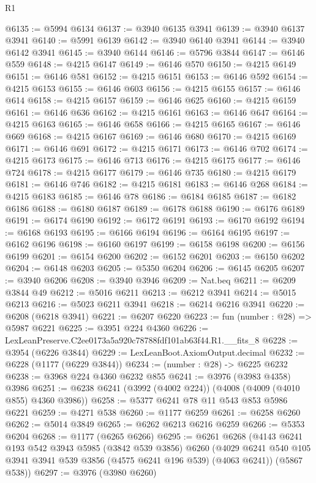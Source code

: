 \begin{lexlean}{R1}
\begin{coremodule}
@6135 := @5994 @6134
@6137 := @3940 @6135 @3941
@6139 := @3940 @6137 @3941
@6140 := @5991 @6139
@6142 := @3940 @6140 @3941
@6144 := @3940 @6142 @3941
@6145 := @3940 @6144
@6146 := @5796 @3844
@6147 := @6146 @559
@6148 := @4215 @6147
@6149 := @6146 @570
@6150 := @4215 @6149
@6151 := @6146 @581
@6152 := @4215 @6151
@6153 := @6146 @592
@6154 := @4215 @6153
@6155 := @6146 @603
@6156 := @4215 @6155
@6157 := @6146 @614
@6158 := @4215 @6157
@6159 := @6146 @625
@6160 := @4215 @6159
@6161 := @6146 @636
@6162 := @4215 @6161
@6163 := @6146 @647
@6164 := @4215 @6163
@6165 := @6146 @658
@6166 := @4215 @6165
@6167 := @6146 @669
@6168 := @4215 @6167
@6169 := @6146 @680
@6170 := @4215 @6169
@6171 := @6146 @691
@6172 := @4215 @6171
@6173 := @6146 @702
@6174 := @4215 @6173
@6175 := @6146 @713
@6176 := @4215 @6175
@6177 := @6146 @724
@6178 := @4215 @6177
@6179 := @6146 @735
@6180 := @4215 @6179
@6181 := @6146 @746
@6182 := @4215 @6181
@6183 := @6146 @268
@6184 := @4215 @6183
@6185 := @6146 @78
@6186 := @6184 @6185
@6187 := @6182 @6186
@6188 := @6180 @6187
@6189 := @6178 @6188
@6190 := @6176 @6189
@6191 := @6174 @6190
@6192 := @6172 @6191
@6193 := @6170 @6192
@6194 := @6168 @6193
@6195 := @6166 @6194
@6196 := @6164 @6195
@6197 := @6162 @6196
@6198 := @6160 @6197
@6199 := @6158 @6198
@6200 := @6156 @6199
@6201 := @6154 @6200
@6202 := @6152 @6201
@6203 := @6150 @6202
@6204 := @6148 @6203
@6205 := @5350 @6204
@6206 := @6145 @6205
@6207 := @3940 @6206
@6208 := @3940 @3946
@6209 := Nat.beq
@6211 := @6209 @3844 @49
@6212 := @5016 @6211
@6213 := @6212 @3941
@6214 := @5015 @6213
@6216 := @5023 @6211 @3941
@6218 := @6214 @6216 @3941
@6220 := @6208 (@6218 @3941)
@6221 := @6207 @6220
@6223 := fun (number : @28) => @5987 @6221
@6225 := @3951 @224 @4360
@6226 := LexLeanPreserve.C2ee0173a5a920c78788fdf101ab63f44.R1.__fits_8
@6228 := @3954 (@6226 @3844)
@6229 := LexLeanBoot.AxiomOutput.decimal
@6232 := @6228 (@1177 (@6229 @3844))
@6234 := (number : @28) -> @6225 @6232
@6238 := @3968 @224 @4360 @6232 @855
@6241 := @3976 (@3983 @4358) @3986
@6251 := @6238 @6241 (@3992 (@4002 @224)) (@4008 (@4009 (@4010 @855) @4360 @3986))
@6258 := @5377 @6241 @78 @11 @543 @853 @5986 @6221
@6259 := @4271 @538
@6260 := @1177 @6259
@6261 := @6258 @6260
@6262 := @5014 @3849
@6265 := @6262 @6213 @6216 @6259
@6266 := @5353 @6204
@6268 := @1177 (@6265 @6266)
@6295 := @6261
    @6268
    (@4143
      @6241
      @193
      @542
      @3943
      @5985
      (@3842 @539 @3856)
      @6260
      (@4029 @6241 @540 @105 @3941 @3941 @539 @3856 (@4575 @6241 @196 @539) (@4063 @6241))
      (@5867 @538))
@6297 := @3976 (@3980 @6260)

\end{coremodule}
\end{lexlean}
